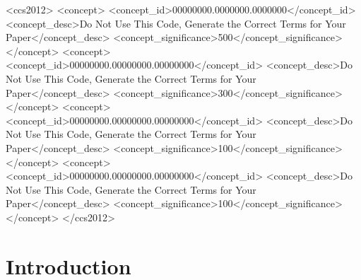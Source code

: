 \documentclass[manuscript,screen,review]{acmart}
\begin{document}
\begin{CCSXML}
<ccs2012>
 <concept>
  <concept_id>00000000.0000000.0000000</concept_id>
  <concept_desc>Do Not Use This Code, Generate the Correct Terms for Your Paper</concept_desc>
  <concept_significance>500</concept_significance>
 </concept>
 <concept>
  <concept_id>00000000.00000000.00000000</concept_id>
  <concept_desc>Do Not Use This Code, Generate the Correct Terms for Your Paper</concept_desc>
  <concept_significance>300</concept_significance>
 </concept>
 <concept>
  <concept_id>00000000.00000000.00000000</concept_id>
  <concept_desc>Do Not Use This Code, Generate the Correct Terms for Your Paper</concept_desc>
  <concept_significance>100</concept_significance>
 </concept>
 <concept>
  <concept_id>00000000.00000000.00000000</concept_id>
  <concept_desc>Do Not Use This Code, Generate the Correct Terms for Your Paper</concept_desc>
  <concept_significance>100</concept_significance>
 </concept>
</ccs2012>
\end{CCSXML}




\maketitle

\section{Introduction}\label{intro}
	
\end{document}

